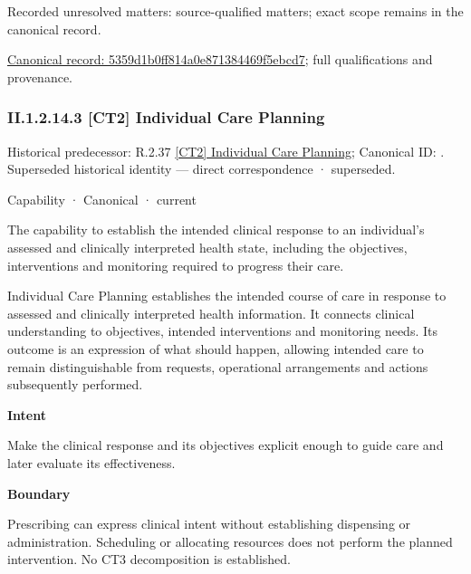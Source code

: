 {\small Recorded unresolved matters: source-qualified matters; exact scope remains in the canonical record.}\par
{\footnotesize \href{../../../../../../../continuum/strategy/capability/5359d1b0ff814a0e871384469f5ebcd7.md}{Canonical record: 5359d1b0ff814a0e871384469f5ebcd7}; full qualifications and provenance.}\par
\subsubsection*{II.1.2.14.3 [CT2] Individual Care Planning}
\label{navigation:II.1.2.14.3}

{\small Historical predecessor: R.2.37 \hyperref[element:574e61e230e643f78c58649adb4db313]{[CT2] Individual Care Planning}; Canonical ID: \texttt{}. Superseded historical identity — direct correspondence · superseded.}\par
\label{element:f036a9866459429a8fb5f5e10727b5e8}
{\small Capability · Canonical · current}\par

The capability to establish the intended clinical response to an individual's assessed and clinically interpreted health state, including the objectives, interventions and monitoring required to progress their care.



Individual Care Planning establishes the intended course of care in response to assessed and clinically interpreted health information. It connects clinical understanding to objectives, intended interventions and monitoring needs. Its outcome is an expression of what should happen, allowing intended care to remain distinguishable from requests, operational arrangements and actions subsequently performed.



\textbf{Intent}



Make the clinical response and its objectives explicit enough to guide care and later evaluate its effectiveness.



\textbf{Boundary}



Prescribing can express clinical intent without establishing dispensing or administration. Scheduling or allocating resources does not perform the planned intervention. No CT3 decomposition is established.


